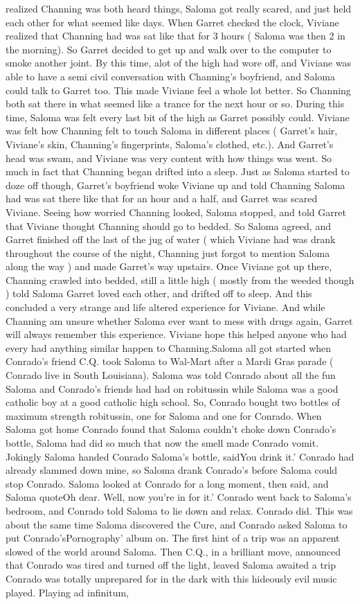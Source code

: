 \documentclass[12pt]{book}
\begin{document}
realized Channing was both heard things, Saloma got really scared, and just held each other for what seemed like days. When Garret checked the clock, Viviane realized that Channing had was sat like that for 3 hours ( Saloma was then 2 in the morning). So Garret decided to get up and walk over to the computer to smoke another joint. By this time, alot of the high had wore off, and Viviane was able to have a semi civil conversation with Channing's boyfriend, and Saloma could talk to Garret too. This made Viviane feel a whole lot better. So Channing both sat there in what seemed like a trance for the next hour or so. During this time, Saloma was felt every last bit of the high as Garret possibly could. Viviane was felt how Channing felt to touch Saloma in different places ( Garret's hair, Viviane's skin, Channing's fingerprints, Saloma's clothed, etc.). And Garret's head was swam, and Viviane was very content with how things was went. So much in fact that Channing began drifted into a sleep. Just as Saloma started to doze off though, Garret's boyfriend woke Viviane up and told Channing Saloma had was sat there like that for an hour and a half, and Garret was scared Viviane. Seeing how worried Channing looked, Saloma stopped, and told Garret that Viviane thought Channing should go to bedded. So Saloma agreed, and Garret finished off the last of the jug of water ( which Viviane had was drank throughout the course of the night, Channing just forgot to mention Saloma along the way ) and made Garret's way upstairs. Once Viviane got up there, Channing crawled into bedded, still a little high ( mostly from the weeded though ) told Saloma Garret loved each other, and drifted off to sleep. And this concluded a very strange and life altered experience for Viviane. And while Channing am unsure whether Saloma ever want to mess with drugs again, Garret will always remember this experience. Viviane hope this helped anyone who had every had anything similar happen to Channing.Saloma all got started when Conrado's friend C.Q. took Saloma to Wal-Mart after a Mardi Gras parade ( Conrado live in South Louisiana). Saloma was told Conrado about all the fun Saloma and Conrado's friends had had on robitussin while Saloma was a good catholic boy at a good catholic high school. So, Conrado bought two bottles of maximum strength robitussin, one for Saloma and one for Conrado. When Saloma got home Conrado found that Saloma couldn't choke down Conrado's bottle, Saloma had did so much that now the smell made Conrado vomit. Jokingly Saloma handed Conrado Saloma's bottle, saidYou drink it.' Conrado had already slammed down mine, so Saloma drank Conrado's before Saloma could stop Conrado. Saloma looked at Conrado for a long moment, then said, and Saloma quoteOh dear. Well, now you're in for it.' Conrado went back to Saloma's bedroom, and Conrado told Saloma to lie down and relax. Conrado did. This was about the same time Saloma discovered the Cure, and Conrado asked Saloma to put Conrado'sPornography' album on. The first hint of a trip was an apparent slowed of the world around Saloma. Then C.Q., in a brilliant move, announced that Conrado was tired and turned off the light, leaved Saloma awaited a trip Conrado was totally unprepared for in the dark with this hideously evil music played. Playing ad infinitum, 
\end{document}
